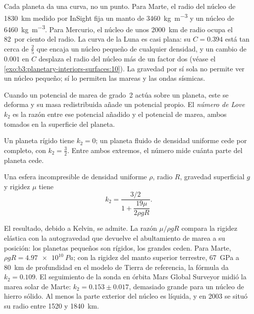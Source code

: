 Cada planeta da una curva, no un punto. Para Marte, el radio del núcleo de
\qty{1830}{km} medido por InSight fija un manto de \qty{3460}{kg.m^{-3}}
y un núcleo de \qty{6460}{kg.m^{-3}}. Para Mercurio, el núcleo de unos
\qty{2000}{km} de radio ocupa el 82~por ciento del radio. La curva de la Luna es
casi plana: su $C = 0.394$ está tan cerca de $\tfrac25$ que encaja un núcleo pequeño
de cualquier densidad, y un cambio de $0.001$ en $C$ desplaza el radio del núcleo
más de un factor dos (véase el \cref{exo:b3:planetary-interiors-surfaces:10}).
La gravedad por sí sola no permite ver un núcleo pequeño; sí lo permiten las mareas y las ondas sísmicas.

\begin{definition}\label{def:b3:planetary-interiors-surfaces:love-number}
Cuando un potencial de marea de grado~2 actúa sobre un planeta, este se deforma y
su masa redistribuida añade un potencial propio. El \emph{número
de Love} $k_2$ es la razón entre ese potencial añadido y
el potencial de marea, ambos tomados en la superficie del planeta.
\end{definition}

Un planeta rígido tiene $k_2 = 0$; un planeta fluido de densidad uniforme cede
por completo, con $k_2 = \tfrac32$. Entre ambos extremos, el número mide
cuánta parte del planeta cede.

\begin{proposition}\label{prop:b3:planetary-interiors-surfaces:kelvin}
Una esfera incompresible de densidad uniforme $\rho$, radio $R$, gravedad superficial
$g$ y rigidez $\mu$ tiene
\[
  k_2 = \frac{3/2}{1 + \dfrac{19\mu}{2\rho g R}} .
\]
\end{proposition}

El resultado, debido a Kelvin, se admite. La razón $\mu/\rho gR$ compara
la rigidez elástica con la autogravedad que devuelve el abultamiento de marea
a su posición: los planetas pequeños son rígidos, los grandes ceden. Para Marte, $\rho gR =
\qty{4.97e10}{Pa}$; con la rigidez del manto superior terrestre,
\qty{67}{GPa} a \qty{80}{km} de profundidad en el modelo de Tierra de referencia, la
fórmula da $k_2 = 0.109$. El seguimiento de la sonda en órbita Mars Global Surveyor
midió la marea solar de Marte: $k_2 = 0.153 \pm 0.017$, demasiado
grande para un núcleo de hierro sólido. Al menos la parte exterior del núcleo es
líquida, y en 2003 se situó su radio entre 1520 y \qty{1840}{km}.

